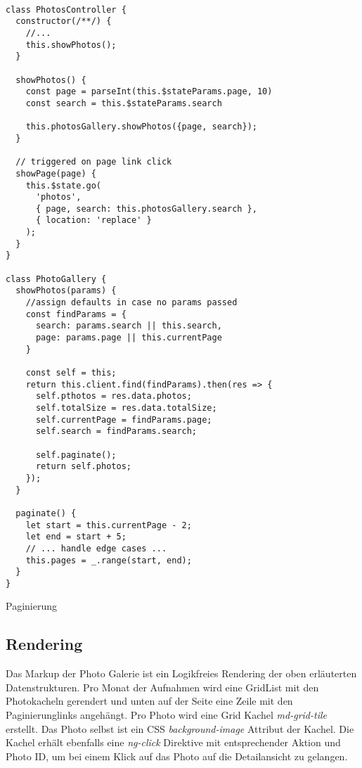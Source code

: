 \begin{listing}[H]
\begin{verbatim}

class PhotosController {
  constructor(/**/) {
    //...
    this.showPhotos();
  }

  showPhotos() {
    const page = parseInt(this.$stateParams.page, 10)
    const search = this.$stateParams.search

    this.photosGallery.showPhotos({page, search});
  }

  // triggered on page link click
  showPage(page) {
    this.$state.go(
      'photos', 
      { page, search: this.photosGallery.search },
      { location: 'replace' }
    );
  }
}

class PhotoGallery {
  showPhotos(params) {
    //assign defaults in case no params passed
    const findParams = {
      search: params.search || this.search,
      page: params.page || this.currentPage
    }

    const self = this;
    return this.client.find(findParams).then(res => {
      self.pthotos = res.data.photos;
      self.totalSize = res.data.totalSize;
      self.currentPage = findParams.page;
      self.search = findParams.search;

      self.paginate();
      return self.photos;
    });
  }

  paginate() {
    let start = this.currentPage - 2;
    let end = start + 5;
    // ... handle edge cases ...
    this.pages = _.range(start, end);
  }
}

\end{verbatim}
\caption{Paginierung}
\label{lst:pagination}
\end{listing} 

\subsection{Rendering}
\label{sec:rendering}

Das Markup der Photo Galerie ist ein Logikfreies Rendering der oben erläuterten Datenstrukturen. Pro Monat der Aufnahmen wird eine GridList mit den Photokacheln gerendert und unten auf der Seite eine Zeile mit den Paginierunglinks angehängt.
Pro Photo wird eine Grid Kachel \textit{md-grid-tile} erstellt. Das Photo selbst ist ein CSS \textit{background-image} Attribut der Kachel. Die Kachel erhält ebenfalls eine \textit{ng-click} Direktive mit entsprechender Aktion und Photo  ID, um bei einem Klick auf das Photo auf die Detailansicht zu gelangen.

